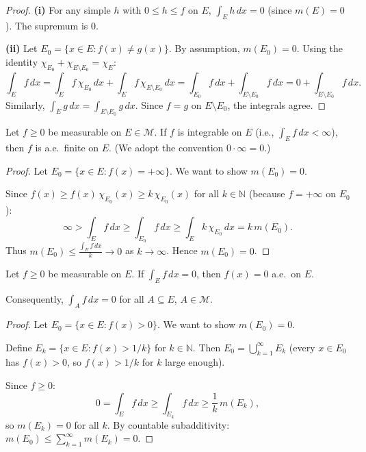 \documentclass[11pt]{report}
\begin{document}
\begin{proof}
\textbf{(i)} For any simple $h$ with $0 \leq h \leq f$ on $E$, $\int_E h\,dx = 0$ (since $m(E) = 0$). The supremum is $0$.

\textbf{(ii)} Let $E_0 = \{x \in E : f(x) \neq g(x)\}$. By assumption, $m(E_0) = 0$. Using the identity $\chi_{E_0} + \chi_{E \setminus E_0} = \chi_E$:
\[
\int_E f\,dx = \int_E f\,\chi_{E_0}\,dx + \int_E f\,\chi_{E \setminus E_0}\,dx = \int_{E_0} f\,dx + \int_{E \setminus E_0} f\,dx = 0 + \int_{E \setminus E_0} f\,dx.
\]
Similarly, $\int_E g\,dx = \int_{E \setminus E_0} g\,dx$. Since $f = g$ on $E \setminus E_0$, the integrals agree.
\end{proof}

\begin{propbox}
Let $f \geq 0$ be measurable on $E \in \mathcal{M}$. If $f$ is integrable on $E$ (i.e., $\int_E f\,dx < \infty$), then $f$ is a.e.\ finite on $E$. (We adopt the convention $0 \cdot \infty = 0$.)
\end{propbox}

\begin{proof}
Let $E_0 = \{x \in E : f(x) = +\infty\}$. We want to show $m(E_0) = 0$.

Since $f(x) \geq f(x)\,\chi_{E_0}(x) \geq k\,\chi_{E_0}(x)$ for all $k \in \mathbb{N}$ (because $f = +\infty$ on $E_0$):
\[
\infty > \int_E f\,dx \geq \int_{E_0} f\,dx \geq \int_E k\,\chi_{E_0}\,dx = k\,m(E_0).
\]
Thus $m(E_0) \leq \frac{\int_E f\,dx}{k} \to 0$ as $k \to \infty$. Hence $m(E_0) = 0$.
\end{proof}

\begin{propbox}
\label{prop:vanishing-nonneg}
Let $f \geq 0$ be measurable on $E$. If $\int_E f\,dx = 0$, then $f(x) = 0$ a.e.\ on $E$.

Consequently, $\int_A f\,dx = 0$ for all $A \subseteq E$, $A \in \mathcal{M}$.
\end{propbox}

\begin{proof}
Let $E_0 = \{x \in E : f(x) > 0\}$. We want to show $m(E_0) = 0$.

Define $E_k = \{x \in E : f(x) > 1/k\}$ for $k \in \mathbb{N}$. Then $E_0 = \bigcup_{k=1}^{\infty} E_k$ (every $x \in E_0$ has $f(x) > 0$, so $f(x) > 1/k$ for $k$ large enough).

Since $f \geq 0$:
\[
0 = \int_E f\,dx \geq \int_{E_k} f\,dx \geq \frac{1}{k}\,m(E_k),
\]
so $m(E_k) = 0$ for all $k$. By countable subadditivity: $m(E_0) \leq \sum_{k=1}^{\infty} m(E_k) = 0$.
\end{proof}
\end{document}

